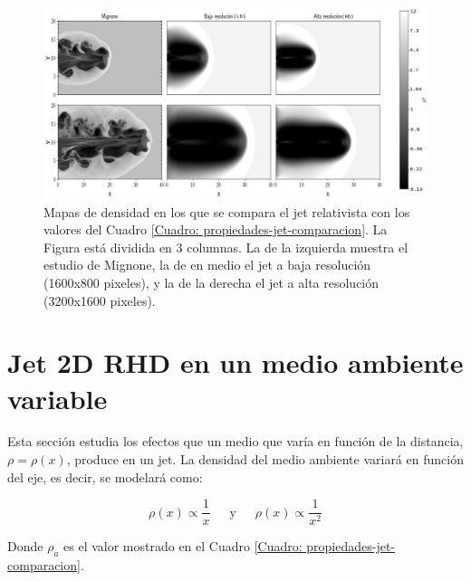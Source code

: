 \documentclass[12pt,a4paper]{book}
\begin{document}
\begin{figure}
  \centering
  \includegraphics[width=1\textwidth]{./Figuras/jet/comparacion/multiple_comparation.png}
    \caption{Mapas de densidad en los que se compara el jet relativista con los valores del Cuadro 
    \ref{Cuadro: propiedades-jet-comparacion}. La Figura está dividida en 3 columnas. La de la izquierda muestra
    el estudio de Mignone, la de en medio el jet a baja resolución (1600x800 pixeles), y la de la derecha el jet a alta 
    resolución (3200x1600 pixeles).
    }\label{fig:comparacion_temporal_del_jet}
\end{figure}



\section{Jet 2D RHD en un medio ambiente variable}




Esta sección estudia los efectos que un medio que varía en función de la distancia, $\rho = \rho(x)$, 
produce en un jet. La densidad del medio ambiente variará en función del eje, es decir, se modelará como:

\begin{equation}
  \rho(x) \varpropto \frac{1}{x} \,\,\,\,\,\,\,\,\, \text{y} \,\,\,\,\,\,\,\,\, \rho(x) \varpropto \frac{1}{x^2}
\end{equation}

Donde $\rho_a$ es el valor mostrado en el Cuadro \ref{Cuadro: propiedades-jet-comparacion}.
\end{document}
